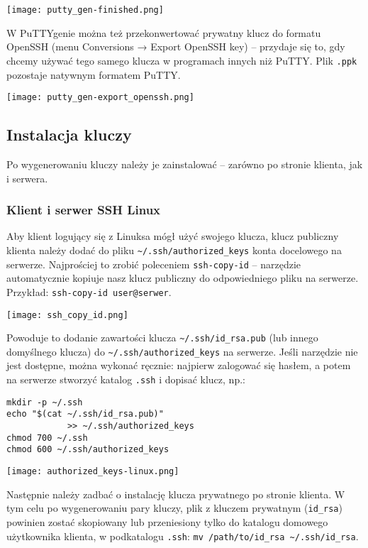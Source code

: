 \documentclass{article}
\begin{document}
\begin{multicols}{2}
\noindent
\texttt{[image: putty\_gen-finished.png]}

W PuTTYgenie można też przekonwertować prywatny klucz do formatu OpenSSH (menu Conversions →
Export OpenSSH key) -- przydaje się to, gdy chcemy używać tego samego klucza w programach innych niż
PuTTY. Plik \verb|.ppk| pozostaje natywnym formatem PuTTY. 

\noindent
\texttt{[image: putty\_gen-export\_openssh.png]}

\subsection{Instalacja kluczy}
Po wygenerowaniu kluczy należy je zainstalować -- zarówno po stronie klienta, jak i serwera.

\subsubsection{Klient i serwer SSH Linux}
Aby klient logujący się z Linuksa mógł użyć swojego klucza, klucz publiczny klienta należy dodać do pliku
\verb|~/.ssh/authorized_keys| konta docelowego na serwerze. Najprościej to zrobić poleceniem \verb|ssh-copy-id| -- narzędzie automatycznie kopiuje nasz klucz publiczny do odpowiedniego pliku na serwerze. Przykład: \verb|ssh-copy-id user@serwer|.

\noindent
\texttt{[image: ssh\_copy\_id.png]}

Powoduje to dodanie zawartości klucza \verb|~/.ssh/id_rsa.pub| (lub innego domyślnego klucza) do \verb|~/.ssh/authorized_keys| na serwerze. Jeśli narzędzie nie jest dostępne, można wykonać ręcznie: najpierw zalogować się hasłem, a potem na serwerze stworzyć katalog \verb|.ssh| i dopisać klucz, np.: 
\begin{verbatim}
mkdir -p ~/.ssh
echo "$(cat ~/.ssh/id_rsa.pub)"
            >> ~/.ssh/authorized_keys
chmod 700 ~/.ssh
chmod 600 ~/.ssh/authorized_keys
\end{verbatim}

\noindent
\texttt{[image: authorized\_keys-linux.png]}

Następnie należy zadbać o instalację klucza prywatnego po stronie klienta. W tym celu po wygenerowaniu pary kluczy, plik z kluczem prywatnym (\verb|id_rsa|) powinien zostać skopiowany lub przeniesiony tylko do katalogu domowego użytkownika klienta, w podkatalogu \verb|.ssh|: \verb|mv /path/to/id_rsa ~/.ssh/id_rsa|.


\end{multicols}
\end{document}

